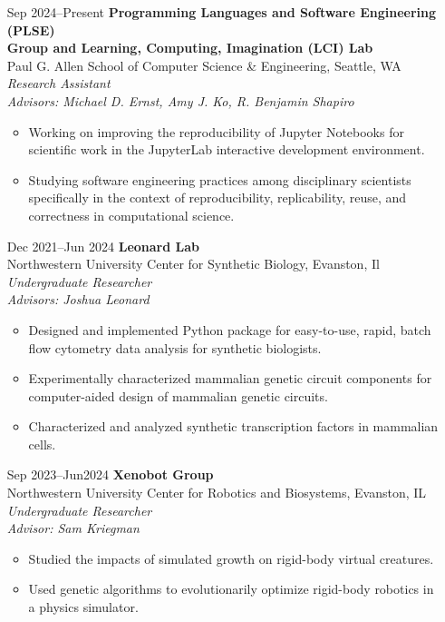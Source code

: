 \documentclass{article}
\begin{document}
\begin{itemize}[leftmargin=1.5in]
    \item[Sep 2024–Present] \textbf{Programming Languages and Software Engineering (PLSE)\\ Group and Learning, Computing, Imagination (LCI) Lab}\\
    Paul G. Allen School of Computer Science \& Engineering, Seattle, WA\\
    \textit{Research Assistant}\\
    \textit{Advisors: Michael D. Ernst, Amy J. Ko, R. Benjamin Shapiro}
    \begin{itemize}
        \item Working on improving the reproducibility of Jupyter Notebooks for scientific work in the JupyterLab interactive development environment.
        \item Studying software engineering practices among disciplinary scientists specifically in the context of reproducibility, replicability, reuse, and correctness in computational science.
    \end{itemize}
    \item[Dec 2021–Jun 2024] \textbf{Leonard Lab}\\
    Northwestern University Center for Synthetic Biology, Evanston, Il\\
    \textit{Undergraduate Researcher}\\
    \textit{Advisors: Joshua Leonard}
    \begin{itemize}
        \item Designed and implemented Python package for easy-to-use, rapid, batch flow cytometry data analysis for synthetic biologists.
        \item Experimentally characterized mammalian genetic circuit components for computer-aided design of mammalian genetic circuits.
        \item Characterized and analyzed synthetic transcription factors in mammalian cells.
    \end{itemize}
    \item[Sep 2023–Jun2024] \textbf{Xenobot Group}\\
     Northwestern University Center for Robotics and Biosystems, Evanston, IL\\
    \textit{Undergraduate Researcher}\\
    \textit{Advisor: Sam Kriegman}
    \begin{itemize}
        \item Studied the impacts of simulated growth on rigid-body virtual creatures.
        \item Used genetic algorithms to evolutionarily optimize rigid-body robotics in a physics simulator.
    \end{itemize}
\end{itemize}
\end{document}

